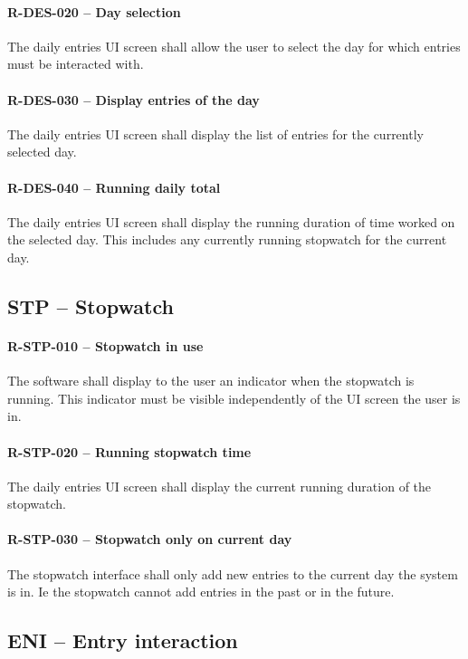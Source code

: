 \paragraph{R-DES-020 -- Day selection}
The daily entries UI screen shall allow the user to select the day for which
entries must be interacted with.

\paragraph{R-DES-030 -- Display entries of the day}
The daily entries UI screen shall display the list of entries for the currently
selected day.

\paragraph{R-DES-040 -- Running daily total}
The daily entries UI screen shall display the running duration of time worked
on the selected day. This includes any currently running stopwatch for the
current day.

\subsection{STP -- Stopwatch}
\paragraph{R-STP-010 -- Stopwatch in use}
The software shall display to the user an indicator when the stopwatch is
running. This indicator must be visible independently of the UI screen
the user is in.

\paragraph{R-STP-020 -- Running stopwatch time}
The daily entries UI screen shall display the current running duration
of the stopwatch.

\paragraph{R-STP-030 -- Stopwatch only on current day}
The stopwatch interface shall only add new entries to the current day
the system is in. Ie the stopwatch cannot add entries in the past or in
the future.

\subsection{ENI -- Entry interaction}
